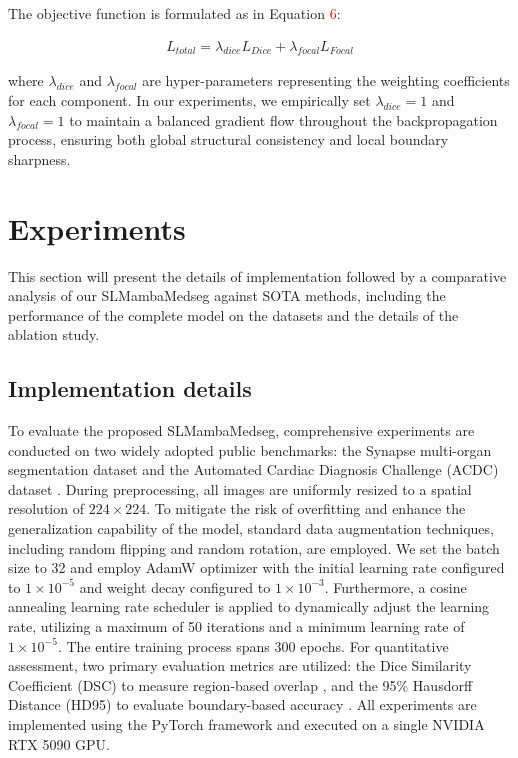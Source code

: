 \documentclass[letterpaper, 10 pt, conference]{ieeeconf}  %
\begin{document}
The objective function is formulated as in Equation \textcolor{red}{6}:

\begin{footnotesize}   
\begin{align}
  L_{total} = \lambda_{dice} L_{Dice} + \lambda_{focal} L_{Focal}
\end{align}
\end{footnotesize}

where $\lambda_{dice}$ and $\lambda_{focal}$ are hyper-parameters representing the weighting coefficients for each component. In our experiments, we empirically set $\lambda_{dice} = 1$ and $\lambda_{focal} = 1$ to maintain a balanced gradient flow throughout the backpropagation process, ensuring both global structural consistency and local boundary sharpness.

\section{Experiments}

This section will present the details of implementation followed by a comparative analysis of our SLMambaMedseg against SOTA methods, including the performance of the complete model on the datasets and the details of the ablation study.

\subsection{Implementation details}

To evaluate the proposed SLMambaMedseg, comprehensive experiments are conducted on two widely adopted public benchmarks: the Synapse multi-organ segmentation dataset \cite{landman2015miccai} and the Automated Cardiac Diagnosis Challenge (ACDC) dataset \cite{bernard2018deep}. During preprocessing, all images are uniformly resized to a spatial resolution of $224 \times 224$. To mitigate the risk of overfitting and enhance the generalization capability of the model, standard data augmentation techniques, including random flipping and random rotation, are employed. We set the batch size to 32 and employ AdamW optimizer \cite{loshchilov2017decoupled} with the initial learning rate configured to $1 \times 10^{-5}$ and weight decay configured to $1 \times 10^{-3}$. Furthermore, a cosine annealing learning rate scheduler \cite{loshchilov2016sgdr} is applied to dynamically adjust the learning rate, utilizing a maximum of 50 iterations and a minimum learning rate of $1 \times 10^{-5}$. The entire training process spans 300 epochs. For quantitative assessment, two primary evaluation metrics are utilized: the Dice Similarity Coefficient (DSC) to measure region-based overlap \cite{milletari2016v}, and the 95\% Hausdorff Distance (HD95) to evaluate boundary-based accuracy \cite{huttenlocher1993comparing}. All experiments are implemented using the PyTorch framework and executed on a single NVIDIA RTX 5090 GPU.
\end{document}
